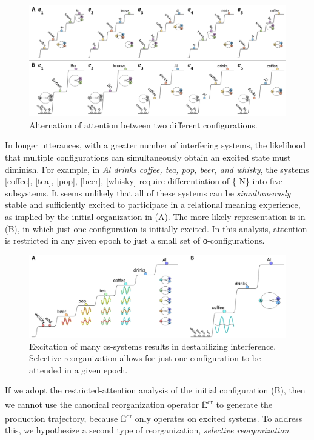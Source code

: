   
\begin{figure}
\includegraphics[width=\textwidth]{figures/Tilsen-img97.png}
\caption{Alternation of attention between two different configurations.}
\label{fig:4:47}
\end{figure}
 

  In longer utterances, with a greater number of interfering systems, the likelihood that multiple configurations can simultaneously obtain an excited state must diminish. For example, in \textit{Al drinks coffee, tea, pop, beer, and whisky}, the systems [coffee], [tea], [pop], [beer], [whisky] require differentiation of \{-N\} into five subsystems. It seems unlikely that all of these systems can be \textit{simultaneously} stable and sufficiently excited to participate in a relational meaning experience, as implied by the initial organization in {}(A). The more likely representation is in (B), in which just one-configuration is initially excited. In this analysis, attention is restricted in any given epoch to just a small set of ϕ-configurations.

  
\begin{figure}
\includegraphics[width=\textwidth]{figures/Tilsen-img98.png}
\caption{Excitation of many cs-systems results in destabilizing interference. Selective reorganization allows for just one-configuration to be attended in a given epoch.}
\label{fig:4:48}
\end{figure}
 

  If we adopt the restricted-attention analysis of the initial configuration (B), then we cannot use the canonical reorganization operator Ê\textsuperscript{cr} to generate the production trajectory, because Ê\textsuperscript{cr} only operates on excited systems. To address this, we hypothesize a second type of reorganization, \textit{selective reorganization}.

